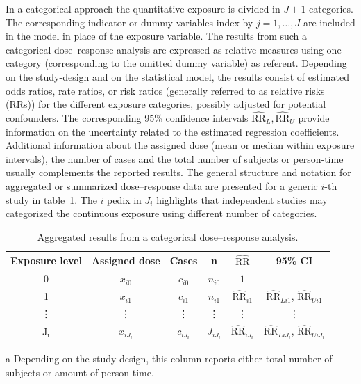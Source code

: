 \documentclass[11pt,a4paper,twoside,openany]{book}\usepackage{knitr}
\begin{document}
{In a categorical approach the quantitative exposure is divided in $J+1$ categories. The corresponding indicator or dummy variables index by $j = 1, \dots, J$ are included in the model in place of the exposure variable. The results from such a categorical dose--response analysis are expressed as relative measures using one category (corresponding to the omitted dummy variable) as referent. Depending on the study-design and on the statistical model, the results consist of estimated odds ratios, rate ratios, or risk ratios (generally referred to as relative risks (RRs)) for the different exposure categories, possibly adjusted for potential confounders. The corresponding 95\% confidence intervals $\widehat{\mathrm{RR}}_L, \widehat{\mathrm{RR}}_U$ provide information on the uncertainty related to the estimated regression coefficients. Additional information about the assigned dose (mean or median within exposure intervals), the number of cases and the total number of subjects or person-time usually complements the reported results. The general structure and notation for aggregated or summarized dose--response data are presented for a generic $i$-th study in table~\ref{tab:aggr_data}. The $i$ pedix in $J_i$ highlights that independent studies may categorized the continuous exposure using different number of categories.

\begin{table}
  \centering
  \begin{threeparttable}
    \caption{Aggregated results from a categorical dose--response analysis.}
    \renewcommand{\arraystretch}{1.5}
    \begin{tabular}{cccccc}
      \hline
      Exposure level & Assigned dose & Cases & n\tnote{a} & $\widehat{\mathrm{RR}}$ & 95\% CI \\
      \hline
      0 & $x_{i0}$ & $c_{i0}$ & $n_{i0}$ & $1$ & --- \\
      1 & $x_{i1}$ & $c_{i1}$ & $n_{i1}$ & $\widehat{\mathrm{RR}}_{i1}$ & $\widehat{{\mathrm{RR}}}_{Li1}$, $\widehat{{\mathrm{RR}}}_{Ui1}$ \\
      \vdots & \vdots & \vdots & \vdots & \vdots & \vdots \\
      $\mathrm{J_i}$ & $x_{iJ_i}$ & $c_{iJ_i}$ & $J_{iJ_i}$ & $\widehat{\mathrm{RR}}_{iJ_i}$ & $\widehat{{\mathrm{RR}}}_{LiJ_i}$, $\widehat{{\mathrm{RR}}}_{UiJ_i}$ \\
      \hline
    \end{tabular}
    \begin{tablenotes}
      \item [a] \footnotesize Depending on the study design, this column reports either total number of subjects or amount of person-time.
    \end{tablenotes}
    \label{tab:aggr_data}
\end{threeparttable}
\end{table}

}
\end{document}

